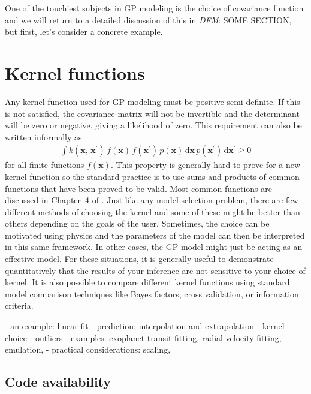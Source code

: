\documentclass[modern, letterpaper]{aastex61}
\newcommand{\dd}{\ensuremath{\,\mathrm{d}}}
\newcommand{\bvec}[1]{{\ensuremath{\boldsymbol{#1}}}}
\newcommand{\todo}[3]{{\color{#2}\emph{#1}: #3}}
\newcommand{\dfmtodo}[1]{\todo{DFM}{red}{#1}}
\begin{document}
One of the touchiest subjects in GP modeling is the choice of covariance
function and we will return to a detailed discussion of this in \dfmtodo{SOME
SECTION}, but first, let's consider a concrete example.

\section{Kernel functions}

Any kernel function used for GP modeling must be positive semi-definite.
If this is not satisfied, the covariance matrix will not be invertible and the
determinant will be zero or negative, giving a likelihood of zero.
This requirement can also be written informally as
\begin{eqnarray}
    \int k(\bvec{x},\,\bvec{x}^\prime)\,f(\bvec{x})\,f(\bvec{x}^\prime)\,
    p(\bvec{x})\dd \bvec{x} \, p(\bvec{x}^\prime)\dd \bvec{x}^\prime
    \ge 0
\end{eqnarray}
for all finite functions $f(\bvec{x})$.
This property is generally hard to prove for a new kernel function so the
standard practice is to use sums and products of common functions that have
been proved to be valid.
Most common functions are discussed in Chapter~4 of \citet{Rasmussen:2006}.
Just like any model selection problem, there are few different methods of
choosing the kernel and some of these might be better than others depending on
the goals of the user.
Sometimes, the choice can be motivated using physics and the parameters of the
model can then be interpreted in this same framework.
In other cases, the GP model might just be acting as an effective model.
For these situations, it is generally useful to demonstrate quantitatively
that the results of your inference are not sensitive to your choice of kernel.
It is also possible to compare different kernel functions using standard model
comparison techniques like Bayes factors, cross validation, or information
criteria.






- an example: linear fit
- prediction: interpolation and extrapolation
- kernel choice
- outliers
- examples: exoplanet transit fitting, radial velocity fitting, emulation,
- practical considerations: scaling,


\subsection{Code availability}
\end{document}
